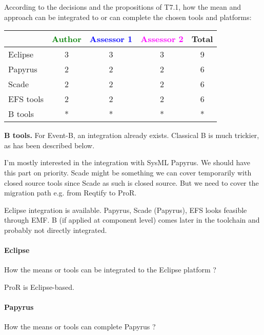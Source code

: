 According to the decisions and the propositions of T7.1, how the mean and approach can be integrated to or can complete the chosen tools and platforms:

\begin{tabular}{|l | c | c | c | c|}
\hline
& \textcolor{green}{Author} & \textcolor{blue}{Assessor 1} & \textcolor{magenta}{Assessor 2} & Total \\
\hline
Eclipse & 3 & 3 & 3 &  9 \\
\hline
Papyrus  & 2 & 2 & 2 & 6 \\
\hline
Scade & 2 & 2 & 2 & 6 \\
\hline
EFS tools & 2 & 2 & 2 & 6 \\
\hline
B tools & * & * & * & * \\
\hline
\end{tabular}

\begin{author_comment}
\textbf{B tools.} For Event-B, an integration already exists.  Classical B is much trickier, as has been described below.
\end{author_comment}

\begin{assessor1}
I'm mostly interested in the integration with SysML Papyrus. We should have this part on priority. Scade might be something we can cover temporarily with closed source tools since Scade as such is closed source. But we need to cover the migration path  e.g. from Reqtify to ProR.
\end{assessor1}

\begin{assessor2}
Eclipse integration is available. Papyrus, Scade (Papyrus), EFS looks feasible through EMF. B (if applied at component level) comes later in the toolchain and probably not directly integrated.
\end{assessor2}

\paragraph{Eclipse}
How the means or tools can be integrated to the Eclipse platform ?

\begin{author_comment}
ProR is Eclipse-based.
\end{author_comment}

\paragraph{Papyrus}
How the means or tools can complete  Papyrus ?

